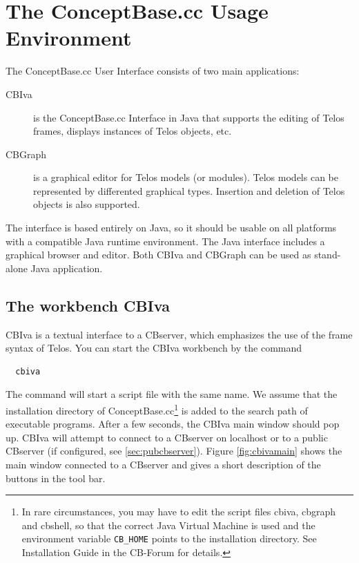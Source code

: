 

\chapter{The ConceptBase.cc Usage Environment}
\label{cha:workbench}

The ConceptBase.cc User Interface consists of two main applications:

\begin{description}
\item[CBIva] is the ConceptBase.cc Interface in Java that supports
the editing of Telos frames, displays instances of Telos objects,
etc.
\item[CBGraph] is a graphical editor for Telos models (or modules). Telos models
can be represented by differented graphical types. Insertion and deletion
of Telos objects is also supported.
\end{description}

The interface is based entirely on Java, so it should be usable on all platforms
with a compatible Java runtime environment. The Java interface includes a graphical browser and editor.
Both CBIva and CBGraph can be used as stand-alone Java application.



\section{The workbench CBIva}

CBIva is a textual interface to a CBserver, which emphasizes the use of the frame syntax
of Telos.
You can start the CBIva workbench by the command

\begin{verbatim}
  cbiva
\end{verbatim}

The command will start a script file with the same name.
We assume that
 the installation directory of ConceptBase.cc\footnote{In rare circumstances, you may have to
edit the script files cbiva, cbgraph and cbshell, so that the correct Java Virtual Machine is used and the environment
variable {\tt CB\_HOME} points to the installation directory. See Installation Guide 
in the CB-Forum for details.} is added to the search path
of executable programs. After a few seconds, the CBIva main
window should pop up. CBIva will attempt to connect to a CBserver on localhost or to
a public CBserver (if configured, see \ref{sec:pubcbserver}).
Figure \ref{fig:cbivamain} shows the main window connected
to a CBserver and gives a short description of the buttons in the tool bar.


